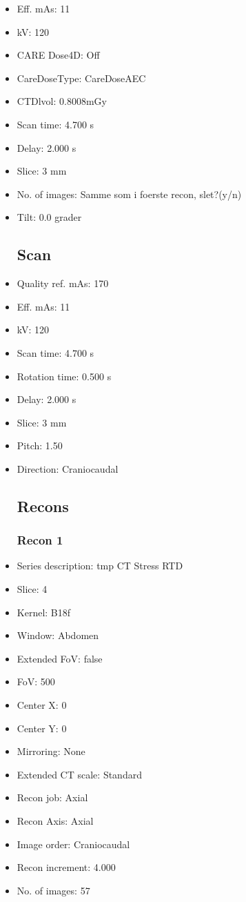 \documentclass[12pt]{article}
\begin{document}
\begin{itemize}
\section{Pause}

\section{CT Stress}
\subsection{Routine}
\item Eff. mAs: 11\item kV: 120\item CARE Dose4D: Off\item CareDoseType: CareDoseAEC\item CTDlvol: 0.8008mGy\item Scan time: 4.700 s\item Delay: 2.000 s\item Slice: 3 mm\item No. of images: Samme som i foerste recon, slet?(y/n)\item Tilt: 0.0 grader
\subsection{Scan}
\item Quality ref. mAs: 170\item Eff. mAs: 11\item kV: 120\item Scan time: 4.700 s\item Rotation time: 0.500 s\item Delay: 2.000 s\item Slice: 3 mm\item Pitch: 1.50\item Direction: Craniocaudal\subsection{Recons}

\subsubsection{Recon 1}
\item Series description: tmp CT Stress RTD
\item Slice: 4
\item Kernel: B18f
\item Window: Abdomen
\item Extended FoV: false
\item FoV: 500
\item Center X: 0
\item Center Y: 0
\item Mirroring: None
\item Extended CT scale: Standard
\item Recon job: Axial
\item Recon Axis: Axial
\item Image order: Craniocaudal
\item Recon increment: 4.000
\item No. of images: 57

\end{itemize}
\end{document}

